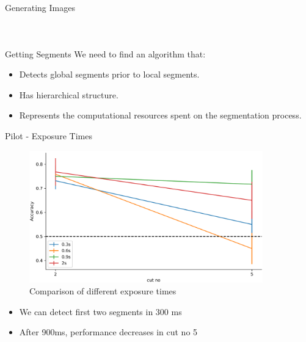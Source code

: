 \documentclass[10pt,xcolor=svgnames]{beamer} %
\begin{document}
\begin{frame}{Generating Images}
\begin{columns}
\begin{figure}
    \end{figure}
\end{columns}
\end{frame}

\begin{frame}{Getting Segments}
        We need to find an algorithm that:
        \begin{itemize}
            \item Detects global segments prior to local segments.
            \item Has hierarchical structure.
            \item Represents the computational resources spent on the segmentation process.
        \end{itemize}
\end{frame}

\begin{frame}{Pilot - Exposure Times}
    \begin{figure} 
        \hspace*{-0.5cm}
        \centering
        \includegraphics[width=0.9\textwidth]{pictures/ExpTimeComparison.png}
        \caption{Comparison of different exposure times}
        \label{fig:comp_exposure_times}
    \end{figure}
    
    \begin{itemize}
        \item We can detect first two segments in 300 ms
        \item After 900ms, performance decreases in cut no 5
    \end{itemize}
\end{frame}
\end{document}
